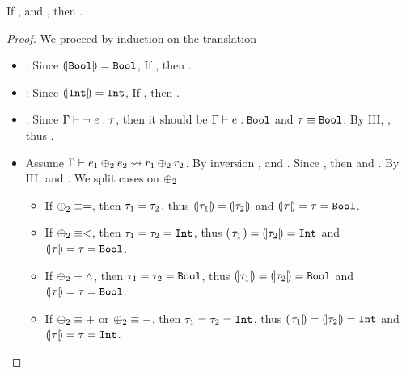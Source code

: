 \begin{lemma}
If ,
and , then
.
\end{lemma}
\begin{proof}
We proceed by induction on the translation
\begin{itemize}
\item \lgbool : Since $\embed{\tbool} = \tbool$,
If , then  
.

\item \lgint :  Since $\embed{\tint} = \tint$,
If , then  
.

\item \lgun : 
Since $\hastype{\env}{\lnot\ e}{\typ}$, then it should be 
$\hastype{\env}{e}{\tbool}$ and $\typ \equiv \tbool$.
By IH,  
\smthastype{\smtenvinit, \embed{\env}}{\pred}{\embed{\tbool}}, 
thus 
\smthastype{\smtenvinit, \embed{\env}}{\lnot \pred}{\embed{\tbool}}. 

\item \lgbinGEN
Assume 	
 $\tologicshort{\env}{e_1\binop e_2}{\tbool}{\pred_1 \binop\pred_2}{\tbool}{\smtenv}{\andaxioms{\axioms_1}{\axioms_2}}$.  
By inversion
    , and
    .
Since 
  , then 
   and  
  .
By IH,  
 and  
.
We split cases on $\binop$
\begin{itemize}
\item If $\binop \equiv =$, then 
  $\typ_1 = \typ_2$, thus $\embed{\typ_1} = \embed{\typ_2}$
  and $\embed{\typ} = \typ = \tbool$.

\item If $\binop \equiv <$, then 
  $\typ_1 = \typ_2 = \tint$, thus $\embed{\typ_1} = \embed{\typ_2} = \tint$
  and $\embed{\typ} = \typ = \tbool$.

\item If $\binop \equiv \land$, then 
  $\typ_1 = \typ_2 = \tbool$, thus $\embed{\typ_1} = \embed{\typ_2} = \tbool$
  and $\embed{\typ} = \typ = \tbool$.
\item If $\binop \equiv +$ or $\binop \equiv -$, then 
  $\typ_1 = \typ_2 = \tint$, thus $\embed{\typ_1} = \embed{\typ_2} = \tint$
  and $\embed{\typ} = \typ = \tint$.
\end{itemize}



\end{itemize}
\end{proof}
